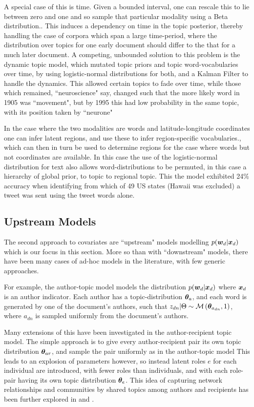 A special case of this is time. Given a bounded interval, one can rescale this to lie between zero and one and so sample that particular modality using a Beta distribution.\cite{Wang2006}. This induces a dependency on time in the topic posterior, thereby handling the case of corpora which span a large time-period, where the distribution over topics for one early document should differ to the that for a much later document. A competing, unbounded solution to this problem is the dynamic topic model\cite{Blei2006a}, which mutated topic priors and topic word-vocabularies over time, by using logistic-normal distributions for both, and a Kalman Filter to handle the dynamics. This allowed certain topics to fade over time, while those which remained, ``neuroscience" say, changed such that the more likely word in 1905 was ``movement", but by 1995 this had low probability in the same topic, with its position taken by ``neurone"

In the case where the two modalities are words and latitude-longitude coordinates one can infer latent regions, and use these to infer region-specific vocabularies\cite{Eisenstein2010}., which can then in turn be used to determine regions for the case where words but not coordinates are available. In this case the use of the logistic-normal distribution for text also allows word-distributions to be permuted, in this case a hierarchy of global prior, to topic to regional topic. This the model exhibited 24\% accuracy when identifying from which of 49 US states (Hawaii was excluded) a tweet was sent using the tweet words alone.

\subsection{Upstream Models}
The second approach to covariates are ``upstream" models modelling $p({ \bm w_d } | { \bm x_d })$ which is our focus in this section. More so than with ``downstream" models, there have been many cases of ad-hoc models in the literature, with few generic approaches.

For example, the author-topic model\cite{RosenZvi2004} models the distribution $p({ \bm w_d } | { \bm x_d })$ where ${ \bm x_d }$ is an author indicator. Each author has a topic-distribution $\bm \theta_a$, and each word is generated by one of the document's authors, such that $z_{dn} | \Theta \sim \mathcal{M} \left( {\bm \theta_{a_{dn}}},{1} \right)$, where $a_{dn}$ is sampled uniformly from the document's authors.

Many extensions of this have been investigated in the author-recipient topic model\cite{MacCallum2007}. The simple approach is to give every author-recipient pair its own topic distribution $\bm \theta_{ar}$, and sample the pair uniformly as in the author-topic model This leads to an explosion of parameters however, so instead latent roles $e$ for each individual are introduced, with fewer roles than individuals, and with each role-pair having its own topic distribution $\bm \theta_e$. This idea of capturing network relationships and communities by shared topics among authors and recipients has been further explored in \cite{Sachan2012} and \cite{Kang2013}.


